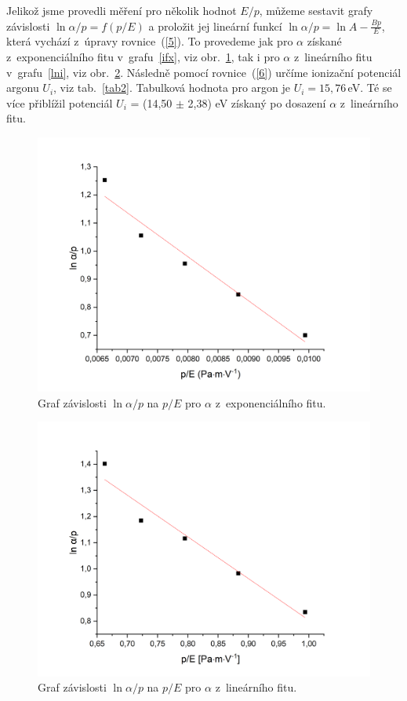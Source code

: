 \documentclass[a4paper,12pt]{article}
\begin{document}
\newpage
Jelikož jsme provedli měření pro několik hodnot $E/p$, můžeme sestavit grafy 
závislosti $\ln \alpha/p = f(p/E)$ a proložit jej lineární funkcí $\ln \alpha/p 
= \ln A - \frac{Bp}{E}$, která vychází z~úpravy rovnice~(\ref{5}). To provedeme 
jak pro $\alpha$ získané z~exponenciálního fitu v~grafu~\ref{ifx}, viz 
obr.~\ref{exp}, tak i pro $\alpha$ z~lineárního fitu v~grafu~\ref{lni}, viz 
obr.~\ref{lin}. Následně pomocí rovnice~(\ref{6}) určíme ionizační potenciál 
argonu $U_i$, viz tab.~\ref{tab2}. Tabulková hodnota pro argon je $U_i = 
15,76$\,eV. Té se více přiblížil potenciál $U_i$ = (14,50 $\pm$  2,38) eV 
získaný po 
dosazení $\alpha$ z~lineárního fitu.
 
 \begin{figure}[h]
 	\centering
 	\includegraphics[width=145mm]{exp.png}
 	\caption{Graf závislosti $\ln \alpha/p$ na $p/E$ pro $\alpha$ 
 	z~exponenciálního fitu.}
 	\label{exp}
 \end{figure}

 \begin{figure}[h]
	\centering
	\includegraphics[width=145mm]{lin.png}
	\caption{Graf závislosti $\ln \alpha/p$ na $p/E$ pro $\alpha$ z~lineárního 
	fitu.}
	\label{lin}
\end{figure}
 
\end{document}
